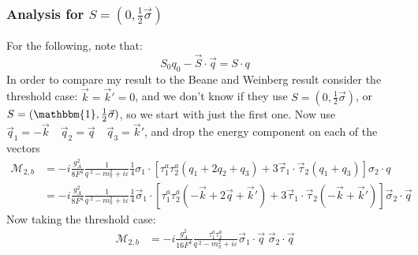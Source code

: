 \documentclass[11pt]{article}
\newcommand\mm{\mathcal{M}}
\begin{document}
\subsubsection{Analysis for $S=(0,\frac{1}{2} \vec{\sigma}) $}
For the following, note that:
\begin{equation}
    S_0 q_0 - \vec{S} \cdot \vec{q} = S \cdot q
\end{equation}
In order to compare my result to the Beane and Weinberg result consider the threshold case: $\vec{k}=\vec{k}'=0$, and we don't know if they use $S=(0, \frac{1}{2} \vec{\sigma})$, or $S=(\mathbbm{1}, \frac{1}{2} \vec{\sigma})$, so we start with just the first one.
Now use $\vec{q}_1=-\vec{k}\quad \vec{q}_2=\vec{q} \quad \vec{q}_3=\vec{k}'$, and drop the energy component on each of the vectors
\begin{align}
    \mm_{2,b}&=-i\frac{g_A^2}{8F^4}\frac{1}{q^{\;2}- m_\pi^2 + i \varepsilon} \frac{1}{4} \sigma_1 \cdot \left[ \tau_1^a\tau_2^a (q_1+2q_2+q_3) +3\vec{\tau}_1 \cdot \vec{\tau}_2 (q_1+q_3)\right] \sigma_2 \cdot q\\
             &=-i\frac{g_A^2}{8F^4}\frac{1}{q^{\;2}- m_\pi^2 + i \varepsilon} \frac{1}{4} \vec{\sigma}_1 \cdot \left[ \tau_1^a\tau_2^a (-\vec{k}+2\vec{q}+\vec{k}') +3\vec{\tau}_1 \cdot \vec{\tau}_2 (-\vec{k}+\vec{k}')\right] \vec{\sigma}_2 \cdot \vec{q}
\end{align}
Now taking the threshold case:
\begin{align}
    \mm_{2,b} &=-i\frac{g_A^2}{16F^4}\frac{\tau_1^a\tau_2^a}{q^{\;2}- m_\pi^2 + i \varepsilon} \vec \sigma_1 \cdot \vec{q}\;\vec\sigma_2 \cdot \vec{q}\label{base}
\end{align}
\end{document}
